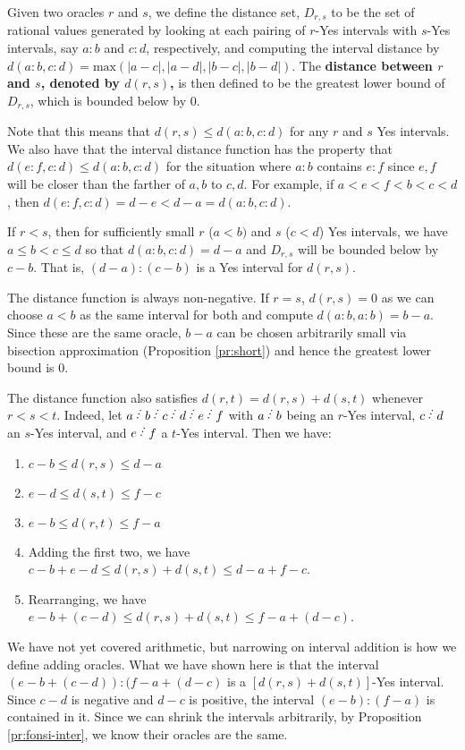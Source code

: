 \documentclass[12pt]{article}
\begin{document}
Given two oracles $r$ and $s$, we define the distance set, $D_{r,s}$ to be the set of rational values generated by looking at each pairing of $r$-Yes intervals with $s$-Yes intervals, say  $a:b$ and $c:d$, respectively, and computing the interval distance by $d(a:b,c:d) = \mathrm{max}(|a-c|, |a-d|,|b-c|,|b-d|)$. The \textbf{distance between $r$ and $s$, denoted by $d(r,s)$,} is then defined to be the greatest lower bound of $D_{r,s}$, which is bounded below by 0. 

Note that this means that $d(r,s) \leq d(a:b, c:d)$ for any $r$ and $s$ Yes intervals. We also have that the interval distance function has the property that $d(e:f, c:d) \leq d(a:b, c:d)$ for the situation where $a:b$ contains $e:f$ since $e, f$ will be closer than the farther of $a,b$ to $c,d$. For example, if $a < e < f < b < c< d$, then $d(e:f, c:d) = d-e < d-a = d(a:b, c:d)$. 

If $r<s$, then for sufficiently small $r$ ($a\lt b)$ and $s$ ($c\lt d$) Yes intervals, we have $a\leq b<c \leq d$ so that $d(a:b,c:d) = d-a$ and $D_{r,s}$ will be bounded below by $c-b$. That is, $(d-a):(c-b)$ is a Yes interval for $d(r,s)$.

The distance function is always non-negative. If $r=s$, $d(r,s)=0$ as we can choose $a<b$ as the same interval for both and compute $d(a:b,a:b)= b-a$. Since these are the same oracle, $b-a$ can be chosen arbitrarily small via bisection approximation (Proposition \ref{pr:short}) and hence the greatest lower bound is 0. 

The distance function also satisfies $d(r,t) = d(r,s) + d(s,t)$ whenever $r < s < t$. Indeed, let $a\lte b\lte c\lte d\lte e\lte f$ with $a\lte b$ being an $r$-Yes interval, $c\lte d$ an $s$-Yes interval, and $e\lte f$ a $t$-Yes interval. Then we have: 
\begin{enumerate}
\item $c-b \leq d(r,s) \leq d-a$
\item $e-d \leq d(s,t) \leq f-c$
\item $e-b \leq d(r,t) \leq f-a$
\item Adding the first two, we have $c-b + e-d \leq d(r,s) + d(s,t) \leq d-a + f-c$.
\item Rearranging, we have $e-b + (c-d) \leq d(r,s) + d(s,t) \leq f-a + (d-c)$.
\end{enumerate}
We have not yet covered arithmetic, but narrowing on interval addition is how we define adding oracles. What we have shown here is that the interval $(e-b + (c-d)): (f-a + (d-c)$ is a $[d(r,s) + d(s,t)]$-Yes interval. Since $c-d$ is negative and $d-c$ is positive, the interval $(e-b):(f-a)$ is contained in it. Since we can shrink the intervals arbitrarily, by Proposition \ref{pr:fonsi-inter}, we know their oracles are the same. 
\end{document}
